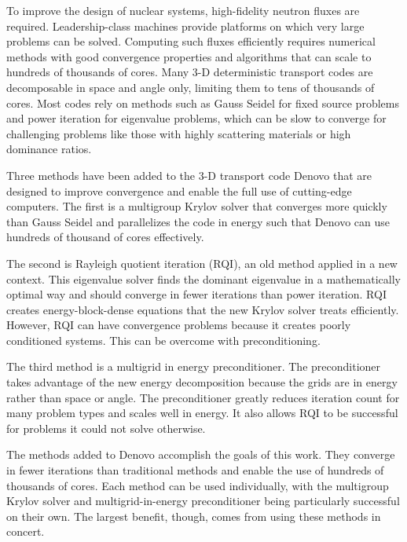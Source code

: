 
\noindent       %
To improve the design of nuclear systems, high-fidelity neutron fluxes are required. Leadership-class machines provide platforms on which very large problems can be solved. Computing such fluxes efficiently requires numerical methods with good convergence properties and algorithms that can scale to hundreds of thousands of cores. Many 3-D deterministic transport codes are decomposable in space and angle only, limiting them to tens of thousands of cores. Most codes rely on methods such as Gauss Seidel for fixed source problems and power iteration for eigenvalue problems, which can be slow to converge for challenging problems like those with highly scattering materials or high dominance ratios. 

\vspace*{0.5em}
\noindent       %
Three methods have been added to the 3-D \Sn transport code Denovo that are designed to improve convergence and enable the full use of cutting-edge computers. The first is a multigroup Krylov solver that converges more quickly than Gauss Seidel and parallelizes the code in energy such that Denovo can use hundreds of thousand of cores effectively. 

\vspace*{0.5em}
\noindent       %
The second is Rayleigh quotient iteration (RQI), an old method applied in a new context. This eigenvalue solver finds the dominant eigenvalue in a mathematically optimal way and should converge in fewer iterations than power iteration. RQI creates energy-block-dense equations that the new Krylov solver treats efficiently. However, RQI can have convergence problems because it creates poorly conditioned systems. This can be overcome with preconditioning. 

\vspace*{0.5em}
\noindent       %
The third method is a multigrid in energy preconditioner. The preconditioner takes advantage of the new energy decomposition because the grids are in energy rather than space or angle. The preconditioner greatly reduces iteration count for many problem types and scales well in energy. It also allows RQI to be successful for problems it could not solve otherwise. 

\vspace*{0.5em}
\noindent       %
The methods added to Denovo accomplish the goals of this work. They converge in fewer iterations than traditional methods and enable the use of hundreds of thousands of cores. Each method can be used individually, with the multigroup Krylov solver and multigrid-in-energy preconditioner being particularly successful on their own. The largest benefit, though, comes from using these methods in concert. 
